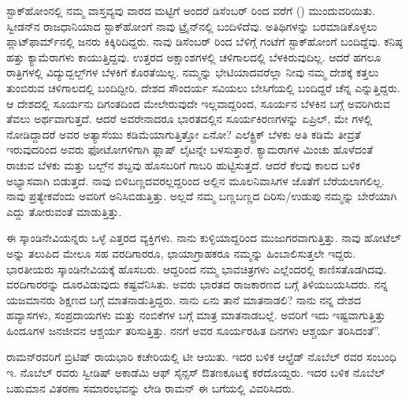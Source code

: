 ಸ್ಟಾಕ್‍ಹೋಂನಲ್ಲಿ ನಮ್ಮ ವಾಸ್ತವ್ಯವು ವಾರದ ಮಟ್ಟಿಗೆ ಅಂದರೆ ಡಿಸೆಂಬರ್  ರಿಂದ  ವರೆಗೆ () ಮುಂದುವರಿಯಿತು. ಸ್ವೀಡನ್‍ನ ರಾಜಧಾನಿಯಾದ ಸ್ಟಾಕ್‍ಹೋಂಗೆ ನಾವು ಟ್ರೈನ್‍ನಲ್ಲಿ ಬಂದಿಳಿದೆವು. ಅತಿಥಿಗಳನ್ನು ಬರಮಾಡಿಕೊಳ್ಳಲು ಪ್ಲಾಟ್‍ಫಾರ್ಮ್‌ನಲ್ಲಿ ಜನರು ಕಿಕ್ಕಿರಿದಿದ್ದರು. ನಾವು ಡಿಸೆಂಬರ್  ರಿಂದ ಬೆಳಿಗ್ಗೆ  ಗಂಟೆಗೆ ಸ್ಟಾಕ್‍ಹೋಂಗೆ ಬಂದಿದ್ದೆವು. ಕನಿಷ್ಠ ಹತ್ತು ಕ್ಯಾಮೆರಾಗಳು ಕಾಯುತ್ತಿದ್ದವು. ಉತ್ತರದ ಅಕ್ಷಾಂಶಗಳಲ್ಲಿ ಚಳಿಗಾಲದಲ್ಲಿ ಬೆಳಕಿರುವುದಿಲ್ಲ. ಆದರೆ ಹಗಲೂ ರಾತ್ರಿಗಳಲ್ಲಿ ವಿದ್ಯುದ್ಬಲ್ಬ್‌ಗಳ ಬೆಳಕಿಗೆ ಕೊರತೆಯಿಲ್ಲ. ನಮ್ಮನ್ನು ಭೇಟಿಯಾದವರೆಲ್ಲಾ ನೀವು ನಮ್ಮ ದೇಶಕ್ಕೆ ಕತ್ತಲು ತುಂಬಿರುವ ಚಳಿಗಾಲದಲ್ಲಿ ಬಂದಿದ್ದೀರಿ. ದೇಶದ ಸೌಂದರ್ಯ ಸವಿಯಲು ಬೇಸಿಗೆಯಲ್ಲಿ ಬಂದಿದ್ದರೆ ಚೆನ್ನ ಎನ್ನುತ್ತಿದ್ದರು. ಆ ದೇಶದಲ್ಲಿ ಸೂರ್ಯನು ದಿಗಂತದಿಂದ ಮೇಲೇರುವುದೇ ಇಲ್ಲವಾದ್ದರಿಂದ, ಸೂರ್ಯನ ಬೆಳಕಿನ ಬಗ್ಗೆ ಅವರಿಗಿರುವ ತೆವಲು ಅರ್ಥವಾಗುತ್ತದೆ. ಆದರೆ ಅವರೇನಾದರೂ ಭಾರತದಲ್ಲಿನ ಸೂರ್ಯಕಿರಣಗಳನ್ನು ಏಪ್ರಿಲ್, ಮೇ ಗಳಲ್ಲಿ ನೋಡಿದ್ದಾದರೆ ಅವರ ಅತ್ಯಾಸೆಯು ಕಡಿಮೆಯಾಗುತ್ತಿತ್ತೋ ಏನೋ? ಎಲೆಕ್ಟ್ರಿಕ್ ಬೆಳಕು ಅತಿ ಕಡಿಮೆ ತೀವ್ರತೆ ಇರುವುದರಿಂದ ಅವರು ಫೋಟೋಗಳಿಗಾಗಿ ಫ್ಲಾಷ್ ಲೈಟನ್ನೇ ಬಳಸುತ್ತಾರೆ. ಕ್ಯಾಮರಾಗಳ ಮಿಂಚು ಹೊಳೆದಂತೆ ರಾಚುವ ಬೆಳಕು ಮತ್ತು ಬಲ್ಬ್‌ನ ಶಬ್ದವು ಹೊಸಬರಿಗೆ ಗಾಬರಿ ಹುಟ್ಟಿಸುತ್ತದೆ. ಆದರೆ ಕೆಲವು ಕಾಲದ ಬಳಿಕ ಅಭ್ಯಾಸವಾಗಿ ಬಿಡುತ್ತದೆ. ನಾವು ಬಿಳಿಬಣ್ಣದವರಲ್ಲದ್ದರಿಂದ ಅಲ್ಲಿನ ಮೂಲನಿವಾಸಿಗಳ ಜೊತೆಗೆ ಬೆರೆಯಲಾಗಲಿಲ್ಲ. ನಾವು ಪ್ರತ್ಯೇಕವೆಂದು ಅವರಿಗೆ ಅನಿಸಿಬಿಡುತ್ತಿತ್ತು. ಅಲ್ಲದೆ ನಮ್ಮ ಬಣ್ಣಬಣ್ಣದ ದಿರಿಸು/ಉಡುಪು ನಮ್ಮನ್ನು ಬೇರೆಯಾಗಿ ಎದ್ದು ತೋರುವಂತೆ ಮಾಡುತ್ತಿತ್ತು.

ಈ ಸ್ಕಾಂಡಿನೇವಿಯನ್ನರು ಒಳ್ಳೆ ಎತ್ತರದ ವ್ಯಕ್ತಿಗಳು. ನಾನು ಕುಳ್ಳಿಯಾದ್ದರಿಂದ ಮುಜುಗರವಾಗುತ್ತಿತ್ತು. ನಾವು ಹೋಟೆಲ್ ಅನ್ನು ತಲುಪಿದ ಮೇಲೂ ಸಹ ವರದಿಗಾರರೂ, ಛಾಯಾಗ್ರಾಹಕರೂ ನಮ್ಮನ್ನು ಹಿಂಬಾಲಿಸುತ್ತಲೇ ಇದ್ದರು. ಭಾರತೀಯರು ಸ್ಕಾಂಡಿನೇವಿಯಕ್ಕೆ ಹೊಸಬರು. ಆದ್ದರಿಂದ ನಮ್ಮ ಭಾವಚಿತ್ರಗಳು ಎಲ್ಲೆಂದರಲ್ಲಿ ಕಾಣಿಸತೊಡಗಿದವು. ವರದಿಗಾರರನ್ನು ದೂರವಿಡುವುದು ಕಷ್ಟವೆನಿಸಿತು. ಅವರು ಭಾರತದ ರಾಜಕಾರಣದ ಬಗ್ಗೆ ತಿಳಿಯಬಯಸಿದರು. ನನ್ನ ಯಜಮಾನರು ಶಿಕ್ಷಣದ ಬಗ್ಗೆ ಮಾತನಾಡುತ್ತಿದ್ದರು. ನಾನು ಏನು ತಾನೆ ಮಾತನಾಡಲಿ? ನಾನು ನನ್ನ ದೇಶದ ಹವ್ಯಾಸಗಳು, ಸಂಪ್ರದಾಯಗಳು ಮತ್ತು ನಂಬಿಕೆಗಳ ಬಗ್ಗೆ ಮಾತ್ರ ಮಾತನಾಡಬಲ್ಲೆ. ಅವರಿಗೆ ಇದು ಇಷ್ಟವಾಗುತ್ತಿತ್ತು ಹಿಂದೂಗಳ ಜನಜೀವನ ಆಶ್ಚರ್ಯ ತರಿಸುತ್ತಿತ್ತು. ನನಗೆ ಅವರ ಸೂರ್ಯರಹಿತ ದಿನಗಳು ಆಶ್ಚರ್ಯ ತರಿಸಿದಂತೆ”.

ರಾಮನ್‍ರವರಿಗೆ ಬ್ರಿಟಿಷ್ ರಾಯಭಾರಿ ಕಚೇರಿಯಲ್ಲಿ ಟೀ ಆಯಿತು. ಇದರ ಬಳಿಕ ಆಲ್ಫ್ರೆಡ್ ನೊಬೆಲ್ ರವರ ಸಂಬಂಧಿ ಇ. ನೊಬೆಲ್ ರವರು ಸ್ವೀಡಿಷ್ ಅಕಾಡೆಮಿ ಆಫ್ ಸೈನ್ಸಸ್ ಔತಣಕೂಟಕ್ಕೆ ಕರೆದೊಯ್ದರು. ಇದರ ಬಳಿಕ ನೊಬೆಲ್ ಬಹುಮಾನ ವಿತರಣಾ ಸಮಾರಂಭವನ್ನು ಲೇಡಿ ರಾಮನ್ ಈ ಬಗೆಯಲ್ಲಿ ವಿವರಿಸಿದರು.

